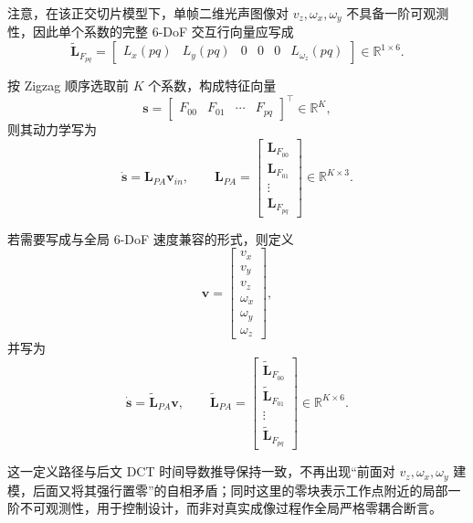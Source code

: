 \documentclass{article}
\begin{document}
注意，在该正交切片模型下，单帧二维光声图像对 $v_z,\omega_x,\omega_y$ 不具备一阶可观测性，因此单个系数的完整 6-DoF 交互行向量应写成
\begin{equation}
\tilde{\mathbf{L}}_{F_{pq}} =
\begin{bmatrix}
L_x(pq) & L_y(pq) & 0 & 0 & 0 & L_{\omega_z}(pq)
\end{bmatrix}
\in \mathbb{R}^{1\times 6}.
\end{equation}

按 Zigzag 顺序选取前 $K$ 个系数，构成特征向量
\begin{equation}
\mathbf{s} =
\begin{bmatrix}
F_{00} & F_{01} & \cdots & F_{pq}
\end{bmatrix}^{\top}
\in \mathbb{R}^{K},
\end{equation}
则其动力学写为
\begin{equation}
\dot{\mathbf{s}} = \mathbf{L}_{PA}\mathbf{v}_{in}, \qquad
\mathbf{L}_{PA} =
\begin{bmatrix}
\mathbf{L}_{F_{00}} \\
\mathbf{L}_{F_{01}} \\
\vdots \\
\mathbf{L}_{F_{pq}}
\end{bmatrix}
\in \mathbb{R}^{K\times 3}.
\end{equation}

若需要写成与全局 6-DoF 速度兼容的形式，则定义
\begin{equation}
\mathbf{v} =
\begin{bmatrix}
v_x \\ v_y \\ v_z \\ \omega_x \\ \omega_y \\ \omega_z
\end{bmatrix},
\end{equation}
并写为
\begin{equation}
\dot{\mathbf{s}} = \tilde{\mathbf{L}}_{PA}\mathbf{v}, \qquad
\tilde{\mathbf{L}}_{PA} =
\begin{bmatrix}
\tilde{\mathbf{L}}_{F_{00}} \\
\tilde{\mathbf{L}}_{F_{01}} \\
\vdots \\
\tilde{\mathbf{L}}_{F_{pq}}
\end{bmatrix}
\in \mathbb{R}^{K\times 6}.
\end{equation}

这一定义路径与后文 DCT 时间导数推导保持一致，不再出现“前面对 $v_z,\omega_x,\omega_y$ 建模，后面又将其强行置零”的自相矛盾；同时这里的零块表示工作点附近的局部一阶不可观测性，用于控制设计，而非对真实成像过程作全局严格零耦合断言。
\end{document}
